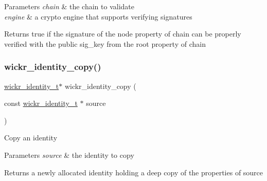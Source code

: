 \begin{DoxyParams}{Parameters}
{\em chain} & the chain to validate \\
\hline
{\em engine} & a crypto engine that supports verifying signatures \\
\hline
\end{DoxyParams}
\begin{DoxyReturn}{Returns}
true if the \textquotesingle{}signature\textquotesingle{} of the \textquotesingle{}node\textquotesingle{} property of \textquotesingle{}chain\textquotesingle{} can be properly verified with the public \textquotesingle{}sig\+\_\+key\textquotesingle{} from the \textquotesingle{}root\textquotesingle{} property of \textquotesingle{}chain\textquotesingle{} 
\end{DoxyReturn}
\mbox{\label{group__wickr__identity_ga14d1fb3ddd1dbd7797eb9b628eef99fe}} 
\subsubsection{\texorpdfstring{wickr\+\_\+identity\+\_\+copy()}{wickr\_identity\_copy()}}
{\footnotesize\ttfamily \hyperlink{structwickr__identity}{wickr\+\_\+identity\+\_\+t}$\ast$ wickr\+\_\+identity\+\_\+copy (\begin{DoxyParamCaption}\item[{const \hyperlink{structwickr__identity}{wickr\+\_\+identity\+\_\+t} $\ast$}]{source }\end{DoxyParamCaption})}

Copy an identity


\begin{DoxyParams}{Parameters}
{\em source} & the identity to copy \\
\hline
\end{DoxyParams}
\begin{DoxyReturn}{Returns}
a newly allocated identity holding a deep copy of the properties of \textquotesingle{}source\textquotesingle{} 
\end{DoxyReturn}
\mbox{\label{group__wickr__identity_ga75bfef275a250a32784231e8c042913b}} 
